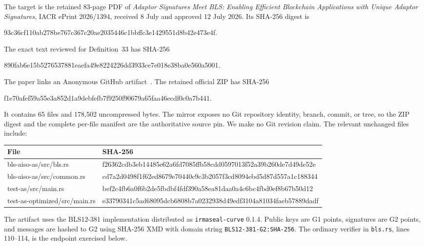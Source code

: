 \documentclass[10pt,a4paper]{article}
\begin{document}
The target is the retained 83-page PDF of \emph{Adaptor Signatures Meet BLS:
Enabling Efficient Blockchain Applications with Unique Adaptor Signatures},
IACR ePrint 2026/1394, received 8 July and approved 12 July 2026. Its SHA-256
digest is
\begin{center}
\small\ttfamily
93c36cf110ab278be767c367c20ae2035446c1bbffc3e1429551d8b42e473e4f.
\end{center}
The exact text reviewed for Definition~33 has SHA-256
\begin{center}
\small\ttfamily
890fab6e15b5276537881eaefa49e8224226dd3933ce7e018e38ba0e560a5001.
\end{center}

The paper links an Anonymous GitHub artifact~\cite{artifact}. The retained official ZIP has
SHA-256
\begin{center}
\small\ttfamily
f1e70afef59a55e3a852d1a9debfefb7f9250f90679a65faa46ecdf0c0a7b441.
\end{center}
It contains 65 files and 178,502 uncompressed bytes. The mirror exposes no
Git repository identity, branch, commit, or tree, so the ZIP digest and the
complete per-file manifest are the authoritative source pin. We make no Git
revision claim. The relevant unchanged files include:

\begin{center}
\begin{tabularx}{\textwidth}{@{}>{\ttfamily\small}l X@{}}
\toprule
File & SHA-256 \\
\midrule
bls-aiso-as/src/bls.rs &
\ttfamily\small f26362cdb3eb14485e62a6fd7085ffb58cdd0597013f52a39b260de7d49de52e \\
bls-aiso-as/src/common.rs &
\ttfamily\small cd7a2d0498f1f62ed8679e70440c9c3b2057f3cd8094ebd5d87d557a1c188344 \\
test-as/src/main.rs &
\ttfamily\small bef2c4fb6a0f6b2de5fbdbf4fdf390a58ea81daa0a4c6bc4fbd0ef8b67b50d12 \\
test-as-optimized/src/main.rs &
\ttfamily\small e33790341c5ad68095dcb6808b7a0232938d49edf3104a81034faeb57889dadf \\
\bottomrule
\end{tabularx}
\end{center}

The artifact uses the BLS12-381 implementation distributed as
\texttt{irmaseal-curve} 0.1.4. Public keys are G1 points, signatures are G2
points, and messages are hashed to G2 using SHA-256 XMD with domain string
\texttt{BLS12-381-G2:SHA-256}. The ordinary verifier in
\texttt{bls.rs}, lines 110--114, is the endpoint exercised below.
\end{document}
